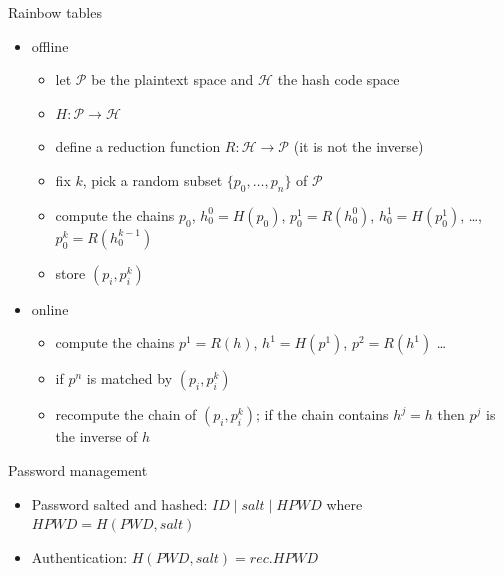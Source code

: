 \documentclass{beamer}
\begin{document}
\begin{frame}{Rainbow tables}
  \begin{itemize}
    \item offline
      \begin{itemize}
      \item let $\mathcal{P}$ be the plaintext space and $\mathcal{H}$ the hash code space
      \item $H:\mathcal{P} \rightarrow \mathcal{H}$
      \item define a reduction function $R: \mathcal{H} \rightarrow \mathcal{P}$ (it is not the inverse)
      \item fix $k$, pick a random subset $\{p_0, \dots, p_n\}$ of $\mathcal{P}$
      \item compute the chains $p_0$, $h^0_0 = H(p_0)$, $p^1_0 = R(h^0_0)$, $h^1_0 = H(p^1_0)$, \dots, 
        $p^k_0 = R(h^{k-1}_0)$
      \item store $(p_i, p^k_i)$
      \end{itemize}
    \item online
      \begin{itemize}
      \item compute the chains $p^1=R(h)$, $h^1 = H(p^1)$, $p^2 = R(h^1)$ \dots
      \item if $p^n$ is matched by $(p_i, p^k_i)$ 
      \item recompute the chain of $(p_i, p^k_i)$; if the chain contains $h^j = h$ then $p^j$ is the inverse of $h$
      \end{itemize}
  \end{itemize}
\end{frame}


\begin{frame}{Password management}
  \begin{itemize}
    \item Password salted and hashed: $ID \mid salt \mid HPWD$ where $HPWD=H(PWD, salt)$ 
    \item Authentication: $H(PWD, salt) = rec.HPWD$
  \end{itemize}
\end{frame}
\end{document}
